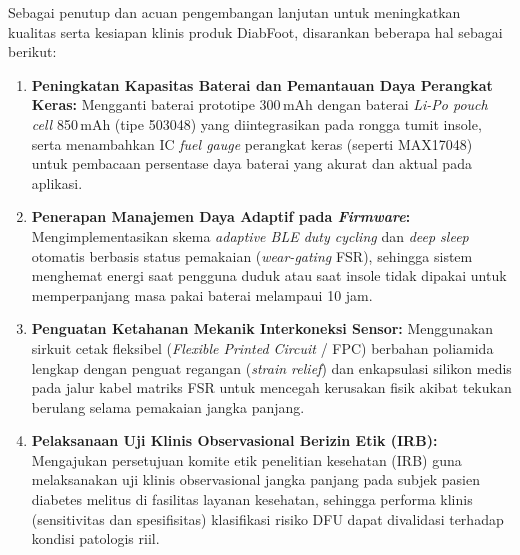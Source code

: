 Sebagai penutup dan acuan pengembangan lanjutan untuk meningkatkan kualitas serta kesiapan klinis produk DiabFoot, disarankan beberapa hal sebagai berikut:
\begin{enumerate}
    \item \textbf{Peningkatan Kapasitas Baterai dan Pemantauan Daya Perangkat Keras:} Mengganti baterai prototipe 300\,mAh dengan baterai \textit{Li-Po pouch cell} 850\,mAh (tipe 503048) yang diintegrasikan pada rongga tumit insole, serta menambahkan IC \textit{fuel gauge} perangkat keras (seperti MAX17048) untuk pembacaan persentase daya baterai yang akurat dan aktual pada aplikasi.
    \item \textbf{Penerapan Manajemen Daya Adaptif pada \textit{Firmware}:} Mengimplementasikan skema \textit{adaptive BLE duty cycling} dan \textit{deep sleep} otomatis berbasis status pemakaian (\textit{wear-gating} FSR), sehingga sistem menghemat energi saat pengguna duduk atau saat insole tidak dipakai untuk memperpanjang masa pakai baterai melampaui 10 jam.
    \item \textbf{Penguatan Ketahanan Mekanik Interkoneksi Sensor:} Menggunakan sirkuit cetak fleksibel (\textit{Flexible Printed Circuit} / FPC) berbahan poliamida lengkap dengan penguat regangan (\textit{strain relief}) dan enkapsulasi silikon medis pada jalur kabel matriks FSR untuk mencegah kerusakan fisik akibat tekukan berulang selama pemakaian jangka panjang.
    \item \textbf{Pelaksanaan Uji Klinis Observasional Berizin Etik (IRB):} Mengajukan persetujuan komite etik penelitian kesehatan (IRB) guna melaksanakan uji klinis observasional jangka panjang pada subjek pasien diabetes melitus di fasilitas layanan kesehatan, sehingga performa klinis (sensitivitas dan spesifisitas) klasifikasi risiko DFU dapat divalidasi terhadap kondisi patologis riil.
\end{enumerate}
